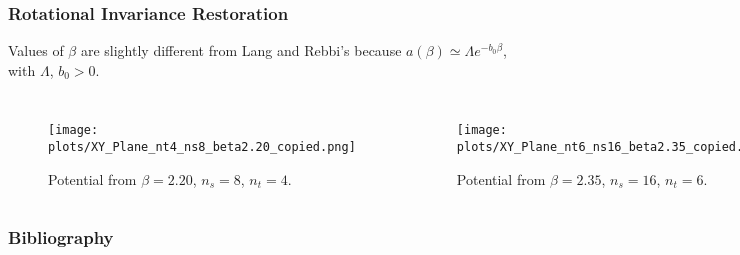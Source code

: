 \documentclass{beamer}
\begin{document}
\begin{frame}
  \frametitle{Rotational Invariance Restoration}
  Values of $\beta$ are slightly different from Lang and Rebbi's because $a(\beta)\simeq\Lambda e^{-b_0\beta}$, with $\Lambda$, $b_0>0$.
  \begin{columns}
    \begin{figure}
      \texttt{[image: plots/XY\_Plane\_nt4\_ns8\_beta2.20\_copied.png]}
      \caption{Potential from $\beta=2.20$, $n_s=8$, $n_t=4$.}
    \end{figure}
    \begin{figure}
      \texttt{[image: plots/XY\_Plane\_nt6\_ns16\_beta2.35\_copied.png]}
      \caption{Potential from $\beta=2.35$, $n_s=16$, $n_t=6$.}
    \end{figure}
  \end{columns}
\end{frame}


\begin{frame}
  \frametitle{Bibliography}
  \printbibliography
\end{frame}
\end{document}
